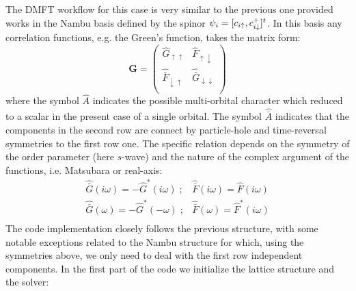 The DMFT workflow for this case is very similar to the previous one
provided works in the Nambu basis defined by the spinor
$\psi_i=[c_{i\uparrow}, c^+_{i\downarrow}]^t$.
In this basis any correlation functions, e.g. the Green's function, takes the matrix form:
\begin{equation}
  {\mathbf G} =
  \begin{pmatrix}
    \hat{G}_{\uparrow\uparrow} & \hat{F}_{\uparrow\downarrow}\\
    \hat{\bar{F}}_{\downarrow\uparrow}  &    \hat{\bar{G}}_{\downarrow\downarrow} \\
   \end{pmatrix}
\end{equation}
where the symbol $\hat{A}$ indicates the possible multi-orbital
character which reduced to a scalar in the present case of a single
orbital. The symbol $\hat{\bar{A}}$ indicates that the components in
the second row are connect by particle-hole and time-reversal
symmetries to the first row one. The specific relation depends on the
symmetry of the order parameter (here $s$-wave) and the nature of the
complex argument of the functions, i.e. Matsubara or real-axis:
\begin{equation}
\begin{array}{cc}
  \hat{\bar{G}}(i\omega) = -\hat{G}^*(i\omega)\;; &  \hat{\bar{F}}(i\omega) = \hat{F}(i\omega)\\
  \hat{\bar{G}}(\omega)  = -\hat{G}^*(-\omega) \;; & \hat{\bar{F}}(\omega) = \hat{F}^*(i\omega)\\
\end{array}
\end{equation}  
The code implementation closely follows the previous structure, with
some notable exceptions related to the Nambu structure for which,
using the symmetries above, we only need to deal with the first row
independent components. In the first part of the code we initialize
the lattice structure and the solver:
